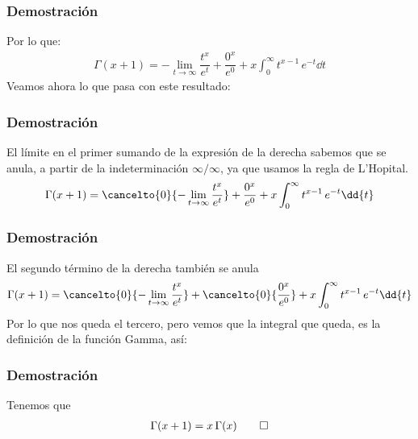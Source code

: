 \begin{frame}
\frametitle{Demostración}
Por lo que:
\begin{align*}
\Gamma (x + 1) = - \lim_{t \to \infty} \dfrac{t^{x}}{e^t} + \dfrac{0^{x}}{e^{0}} + x \int_{0}^{\infty} t^{x-1} \, e^{-t} \dd{t}
\end{align*}
\pause
Veamos ahora lo que pasa con este resultado:
\end{frame}
\begin{frame}
\frametitle{Demostración}
El límite en el primer sumando de la expresión de la derecha sabemos que se anula, a partir de la indeterminación $\infty / \infty$, ya que usamos la regla de L'Hopital.
\begin{align*}
\Gamma (x + 1) = \cancelto{0}{- \lim_{t \to \infty} \dfrac{t^{x}}{e^t}} + \dfrac{0^{x}}{e^{0}} + x \int_{0}^{\infty} t^{x-1} \, e^{-t} \dd{t}
\end{align*}
\end{frame}
\begin{frame}
\frametitle{Demostración}
El segundo término de la derecha también se anula
\begin{align*}
\Gamma (x + 1) = \cancelto{0}{- \lim_{t \to \infty} \dfrac{t^{x}}{e^t}} + \cancelto{0}{\dfrac{0^{x}}{e^{0}}} + x \int_{0}^{\infty} t^{x-1} \, e^{-t} \dd{t}
\end{align*}
\pause
Por lo que nos queda el tercero, pero vemos que la integral que queda, es la definición de la función Gamma, así:
\end{frame}
\begin{frame}
\frametitle{Demostración}
Tenemos que
\begin{align}
\Gamma (x + 1) = x \, \Gamma (x) \qed
\label{eq:ecuacion_01_04_01}
\end{align}
\end{frame}
